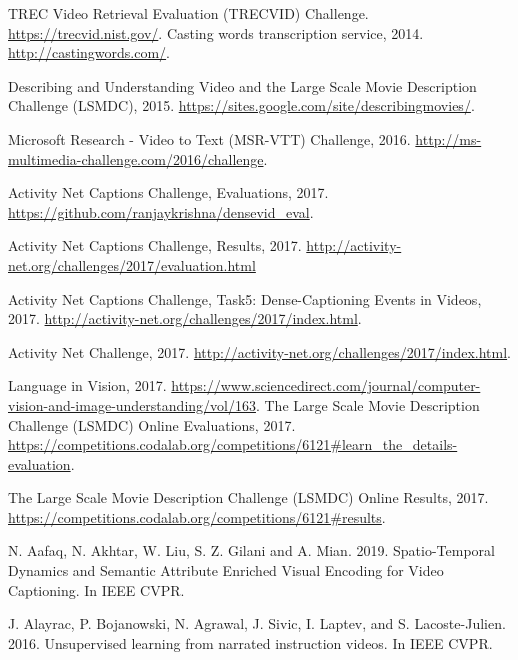 \documentclass[10pt,journal,compsoc]{IEEEtran}
\begin{document}
\begin{thebibliography}{1}

\vspace{-1mm}
TREC Video Retrieval Evaluation (TRECVID) Challenge. \url{https://trecvid.nist.gov/}. 
Casting words transcription service, 2014. \url{http://castingwords.com/}. 

Describing and Understanding Video and the Large Scale Movie Description Challenge (LSMDC), 2015. \url{https://sites.google.com/site/describingmovies/}.

Microsoft Research - Video to Text (MSR-VTT) Challenge, 2016. \url{http://ms-multimedia-challenge.com/2016/challenge}.

Activity Net Captions Challenge, Evaluations, 2017. \url{https://github.com/ranjaykrishna/densevid_eval}.

Activity Net Captions Challenge, Results, 2017. \url{http://activity-net.org/challenges/2017/evaluation.html}

Activity Net Captions Challenge, Task5: Dense-Captioning Events in Videos, 2017. \url{http://activity-net.org/challenges/2017/index.html}.

Activity Net Challenge, 2017. \url{http://activity-net.org/challenges/2017/index.html}.

Language in Vision, 2017. \url{https://www.sciencedirect.com/journal/computer-vision-and-image-understanding/vol/163}.
The Large Scale Movie Description Challenge (LSMDC) Online Evaluations, 2017.  \url{https://competitions.codalab.org/competitions/6121#learn_the_details-evaluation}.

The Large Scale Movie Description Challenge (LSMDC) Online Results, 2017. \url{https://competitions.codalab.org/competitions/6121#results}.

N. Aafaq, N. Akhtar, W. Liu, S. Z. Gilani and A. Mian. 2019. Spatio-Temporal Dynamics and Semantic Attribute Enriched Visual Encoding for Video Captioning. In IEEE CVPR.

J. Alayrac, P. Bojanowski, N. Agrawal, J. Sivic, I. Laptev, and S. Lacoste-Julien. 2016.
Unsupervised learning from narrated instruction videos. In IEEE CVPR.


\end{thebibliography}
\end{document}
